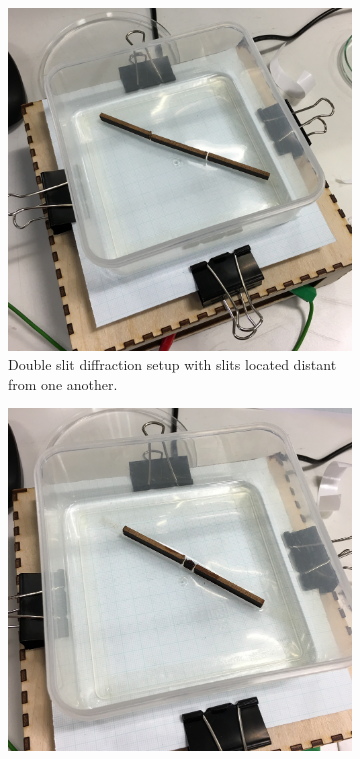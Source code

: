 \begin{figure}[h]
    \centering
    \begin{subfigure}{0.475\textwidth}
        \includegraphics[width=\textwidth]{prototype/exp_rep_imgs/double_slit_setup_1.jpg}
        \caption{Double slit diffraction setup with slits located distant from one another.}
    \end{subfigure}
    \begin{subfigure}{0.475\textwidth}
        \includegraphics[width=\textwidth]{prototype/exp_rep_imgs/double_slit_setup_2.jpg}

\end{subfigure}
\end{figure}
